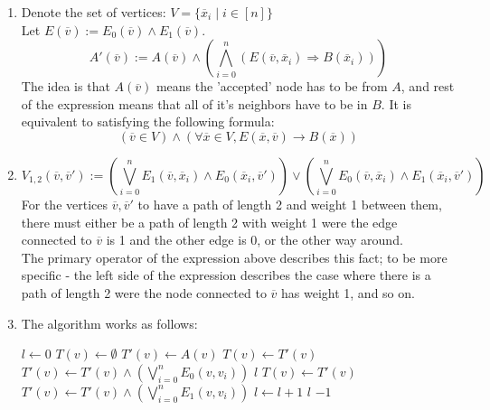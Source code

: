 \documentclass{article}
\newcommand{\lv}[0]{\overline{v}}
\newcommand{\lx}[0]{\overline{x}}
\begin{document}
\begin{enumerate}[label=\textbf{\alph*.}]
    \item 
        Denote the set of vertices: $V=\{\lx_i\mid i\in[n]\}$\\
        Let $E(\lv):=E_0(\lv)\wedge E_1(\lv)$.
        \[
            A'(\lv):=A(\lv)\wedge \left(\bigwedge_{i=0}^n(E(\lv,\lx_i)\Rightarrow B(\lx_i))\right)
        \]
        The idea is that $A(\lv)$ means the 'accepted' node has to be from $A$,
        and rest of the expression means that all of it's neighbors have to be in $B$.
        It is equivalent to satisfying the following formula:
        \[
            (\lv\in V)\wedge \left(\forall \lx\in V, E(\lx, \lv)\rightarrow B(\lx)\right)
        \]
    \item 
        \[
            V_{1,2}(\lv,\lv'):=
                \left(\bigvee_{i=0}^nE_1(\lv, \lx_i)\wedge E_0(\lx_i, \lv')\right)
                \vee
                \left(\bigvee_{i=0}^nE_0(\lv, \lx_i)\wedge E_1(\lx_i, \lv')\right)
        \]
        For the vertices $\lv,\lv'$ to have a 
        path of length 2 and weight 1 between them,
        there must either be a path of length 2 with weight
        1 were the edge connected to $\lv$ is 1 and the other edge is 0,
        or the other way around.\\
        The primary operator of the expression above describes this fact;
        to be more specific - the left side of the expression
        describes the case where there is a path of length 2 
        were the node connected to $\lv$ has weight 1, and so on.
    \item The algorithm works as follows:
    \begin{algorithmic}
        \State $l\leftarrow 0$
        \State $T(v)\leftarrow\emptyset$
        \State $T'(v)\leftarrow A(v)$
                \State $T(v)\leftarrow T'(v)$
                \State $T'(v)\leftarrow T'(v)\wedge\left(\bigvee_{i=0}^nE_0(v,v_i)\right)$
                    \State \Return $l$
                \EndIf
            \EndWhile
            \State $T(v)\leftarrow T'(v)$
            \State $T'(v)\leftarrow T'(v)\wedge\left(\bigvee_{i=0}^nE_1(v,v_i)\right)$
            \State $l\leftarrow l+1$
                \State \Return $l$
            \EndIf
        \EndWhile
        \State \Return $-1$
    \end{algorithmic}
\end{enumerate}
    
\end{document}
